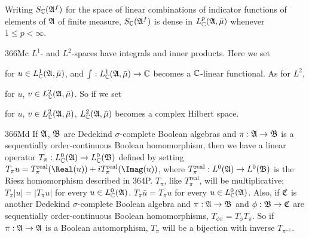 Writing $S_{\Bbb C}(\frak A^f)$ for the space of linear combinations of
indicator functions of elements of $\frak A$ of finite measure,
$S_{\Bbb C}(\frak A^f)$ is dense in $L^p_{\Bbb C}(\frak A,\bar\mu)$
whenever $1\le p<\infty$.

\spheader 366Mc
$L^1$- and $L^2$-spaces
have integrals and inner products.   Here we set


\noindent for $u\in L^1_{\Bbb C}(\frak A,\bar\mu)$, and
$\int:L^1_{\Bbb C}(\frak A,\bar\mu)\to\Bbb C$ becomes a
$\Bbb C$-linear functional.
As for $L^2$,


\noindent for $u$, $v\in L^2_{\Bbb C}(\frak A,\bar\mu)$.   So if we set


\noindent for $u$, $v\in L^2_{\Bbb C}(\frak A,\bar\mu)$,
$L^2_{\Bbb C}(\frak A,\bar\mu)$ becomes a complex Hilbert space.

\spheader 366Md
If $\frak A$, $\frak B$ are Dedekind $\sigma$-complete Boolean algebras
and $\pi:\frak A\to\frak B$ is
a sequentially order-continuous Boolean homomorphism, then we have a
linear operator $T_{\pi}:L^0_{\Bbb C}(\frak A)\to L^0_{\Bbb C}(\frak B)$
defined by setting
$T_{\pi}u
=T_{\pi}^{\text{real}}(\Real(u))+iT^{\text{real}}_{\pi}(\Imag(u))$,
where $T^{\text{real}}_{\pi}:L^0(\frak A)\to L^0(\frak B)$
is the Riesz homomorphism
described in 364P.   $T_{\pi}$,
like $T^{\text{real}}_{\pi}$, will be
multiplicative;  $T_{\pi}|u|=|T_{\pi}u|$
for every
$u\in L^0_{\Bbb C}(\frak A)$.   
$T_{\pi}\bar u=\overline{T_{\pi}u}$ for every $u\in L^0_{\Bbb C}(\frak A)$.
Also, if $\frak C$ is another
Dedekind $\sigma$-complete
Boolean algebra and $\pi:\frak A\to\frak B$ and $\phi:\frak B\to\frak C$
are sequentially order-continuous Boolean homomorphisms,
$T_{\phi\pi}=T_{\phi}T_{\pi}$.   So if $\pi:\frak A\to\frak A$ is a
Boolean automorphism, $T_{\pi}$ will be a bijection with inverse
$T_{\pi^{-1}}$.

